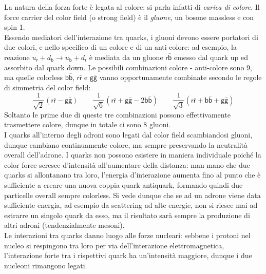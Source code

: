 La natura della forza forte è legata al colore: si parla infatti di \textit{carica di colore}. Il force carrier del color field (o strong field) è il \textit{gluone}, un bosone massless e con spin 1.\\
Essendo mediatori dell'interazione tra quarks, i gluoni devono essere portatori di due colori, e nello specifico di un colore e di un anti-colore: ad esempio, la reazione $ u_{\mathsf{r}} + d_{\mathsf{b}} \rightarrow u_{\mathsf{b}} + d_{\mathsf{r}} $ è mediata da un gluone $ \mathsf{r}\bar{\mathsf{b}} $ emesso dal quark up ed assorbito dal quark down. Le possibili combinazioni colore - anti-colore sono 9, ma quelle colorless $ \mathsf{b}\bar{\mathsf{b}} $, $ \mathsf{r}\bar{\mathsf{r}} $ e $ \mathsf{g}\bar{\mathsf{g}} $ vanno opportunamente combinate secondo le regole di simmetria del color field:
\begin{equation*}
	\frac{1}{\sqrt{2}} \left( \mathsf{r}\bar{\mathsf{r}} - \mathsf{g}\bar{\mathsf{g}} \right)
	\qquad
	\frac{1}{\sqrt{6}} \left( \mathsf{r}\bar{\mathsf{r}} + \mathsf{g}\bar{\mathsf{g}} - 2\mathsf{b}\bar{\mathsf{b}} \right)
	\qquad
	\frac{1}{\sqrt{3}} \left( \mathsf{r}\bar{\mathsf{r}} + \mathsf{b}\bar{\mathsf{b}} + \mathsf{g}\bar{\mathsf{g}} \right)
\end{equation*}
Soltanto le prime due di queste tre combinazioni possono effettivamente trasmettere colore, dunque in totale ci sono 8 gluoni.\\
I quarks all'interno degli adroni sono legati dal color field scambiandosi gluoni, dunque cambiano continuamente colore, ma sempre preservando la neutralità overall dell'adrone. I quarks non possono esistere in maniera individuale poiché la color force scresce d'intensità all'aumentare della distanza: man mano che due quarks si allontanano tra loro, l'energia d'interazione aumenta fino al punto che è sufficiente a creare una nuova coppia quark-antiquark, formando quindi due particelle overall sempre colorless. Si vede dunque che se ad un adrone viene data sufficiente energia, ad esempio da scattering ad alte energie, non si riesce mai ad estrarre un singolo quark da esso, ma il risultato sarà sempre la produzione di altri adroni (tendenzialmente mesoni).\\
Le interazioni tra quarks danno luogo alle forze nucleari: sebbene i protoni nel nucleo si respingono tra loro per via dell'interazione elettromagnetica, l'interazione forte tra i rispettivi quark ha un'intensità maggiore, dunque i due nucleoni rimangono legati.










